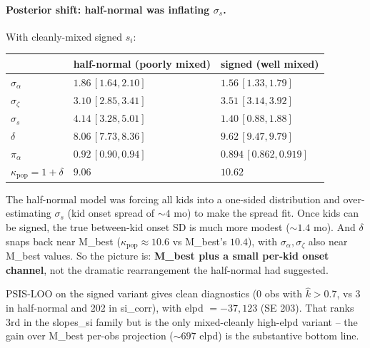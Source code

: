 \documentclass[11pt]{article}
\begin{document}
\paragraph{Posterior shift: half-normal was inflating \(\sigma_s\).}
With cleanly-mixed signed \(s_i\):
\begin{center}
\begin{tabular}{@{}lll@{}}
\toprule
 & half-normal (poorly mixed) & signed (well mixed) \\
\midrule
\(\sigma_\alpha\) & \(1.86\,[1.64, 2.10]\) & \(1.56\,[1.33, 1.79]\) \\
\(\sigma_\zeta\)  & \(3.10\,[2.85, 3.41]\) & \(3.51\,[3.14, 3.92]\) \\
\(\sigma_s\)      & \(4.14\,[3.28, 5.01]\) & \(\mathbf{1.40\,[0.88, 1.88]}\) \\
\(\delta\)        & \(8.06\,[7.73, 8.36]\) & \(\mathbf{9.62\,[9.47, 9.79]}\) \\
\(\pi_\alpha\)    & \(0.92\,[0.90, 0.94]\) & \(0.894\,[0.862, 0.919]\) \\
\(\kappa_{\text{pop}} = 1+\delta\) & \(9.06\) & \(\mathbf{10.62}\) \\
\bottomrule
\end{tabular}
\end{center}
The half-normal model was forcing all kids into a one-sided
distribution and over-estimating \(\sigma_s\) (kid onset spread of
\(\sim 4\) mo) to make the spread fit. Once kids can be signed, the
true between-kid onset SD is much more modest (\(\sim 1.4\) mo). And
\(\delta\) snaps back near M\_best (\(\kappa_{\text{pop}} \approx
10.6\) vs M\_best's \(10.4\)), with \(\sigma_\alpha, \sigma_\zeta\)
also near M\_best values. So the picture is: \textbf{M\_best plus a
small per-kid onset channel}, not the dramatic rearrangement the
half-normal had suggested.

PSIS-LOO on the signed variant gives clean diagnostics (0 obs with
\(\hat k > 0.7\), vs 3 in half-normal and 202 in si\_corr), with
elpd \(= -37{,}123\) (SE 203). That ranks 3rd in the slopes\_si family
but is the only mixed-cleanly high-elpd variant -- the gain over
M\_best per-obs projection (\(\sim\!697\) elpd) is the substantive
bottom line.
\end{document}
